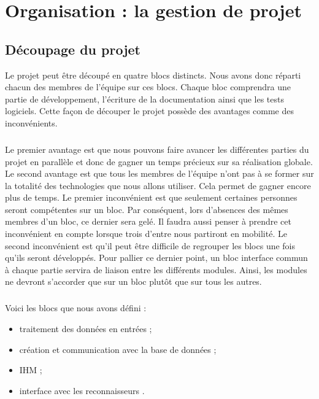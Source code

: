 \chapter{Organisation : la gestion de projet}

\section{Découpage du projet}

Le projet peut être découpé en quatre blocs distincts. Nous avons donc réparti chacun des membres de l’équipe sur ces blocs. Chaque bloc comprendra une partie de développement, l’écriture de la documentation ainsi que les tests logiciels. Cette façon de découper le projet possède des avantages comme des inconvénients.

\paragraph{}

Le premier avantage est que nous pouvons faire avancer les différentes parties du projet en parallèle et donc de gagner un temps précieux sur sa réalisation globale. Le second avantage est que tous les membres de l’équipe n’ont pas à se former sur la totalité des technologies que nous allons utiliser. Cela permet de gagner encore plus de temps. Le premier inconvénient est que seulement certaines personnes seront compétentes sur un bloc. Par conséquent, lors d’absences des mêmes membres d’un bloc, ce dernier sera gelé. Il faudra aussi penser à prendre cet inconvénient en compte lorsque trois d’entre nous partiront en mobilité. Le second inconvénient est qu’il peut être difficile de regrouper les blocs une fois qu’ils seront développés. Pour pallier ce dernier point, un bloc interface commun à chaque partie servira de liaison entre les différents modules. Ainsi, les modules ne devront s’accorder que sur un bloc plutôt que sur tous les autres.

\paragraph{}

Voici les blocs que nous avons défini :

\begin{itemize}
\item traitement des données en entrées ;
\item création et communication avec la base de données  ;
\item IHM ;
\item interface avec les reconnaisseurs .
\end{itemize}

